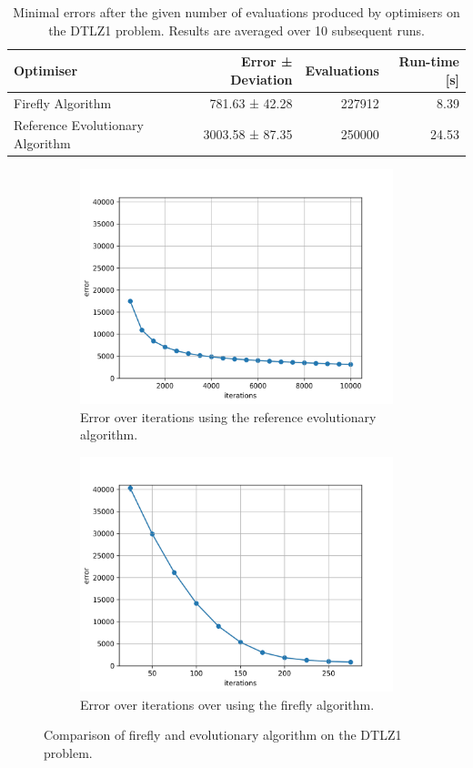 \begin{table}[H]
  \centering
   \begin{tabular}{|l r r r|}
     \hline
     \textbf{Optimiser} & \textbf{Error ± Deviation} & \textbf{Evaluations} & \textbf{Run-time [s]} \\
     \hline
     Firefly Algorithm & 781.63 ± 42.28 & 227912 & 8.39 \\
     Reference Evolutionary Algorithm & 3003.58 ± 87.35 & 250000 & 24.53 \\
     \hline
  \end{tabular}
  \caption{Minimal errors after the given number of evaluations produced by optimisers on the DTLZ1 problem. Results are averaged over 10 subsequent runs.}
  \label{tab:firefly_vs_ea}
\end{table}

\begin{figure}
  \centering
  \begin{subfigure}{.5\textwidth}
    \centering
    \captionsetup{width=0.75\linewidth}
    \includegraphics[width=0.75\linewidth]{assets/reference_dtlz.png}
    \caption{Error over iterations using the reference evolutionary algorithm.}
    \label{fig:sub1}
  \end{subfigure}%
  \begin{subfigure}{.5\textwidth}
    \centering
    \captionsetup{width=0.75\linewidth}
    \includegraphics[width=0.75\linewidth]{assets/firefly_dtlz.png}
    \caption{Error over iterations over using the firefly algorithm.}
    \label{fig:sub2}
  \end{subfigure}
  \caption{Comparison of firefly and evolutionary algorithm on the DTLZ1 problem.}
  \label{fig:firefly_vs_ea}
\end{figure}

